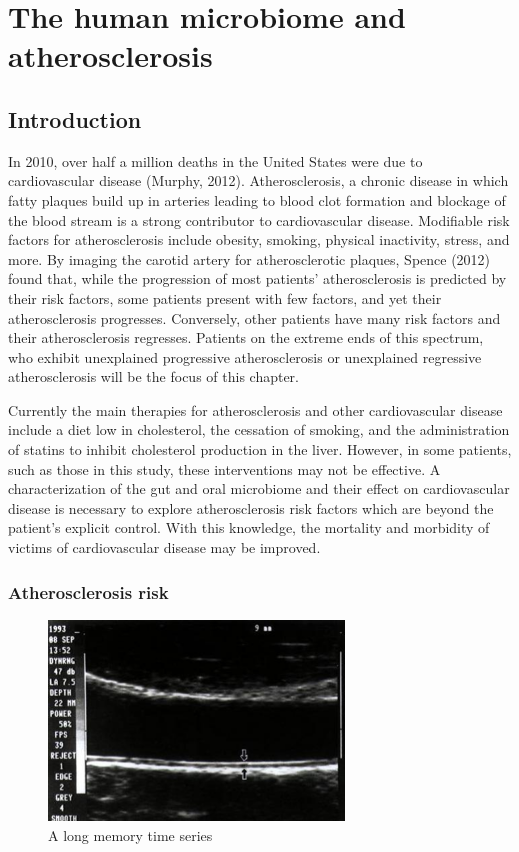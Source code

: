 \chapter{The human microbiome and atherosclerosis}
\section{Introduction}
In 2010, over half a million deaths in the United States were due to cardiovascular disease (Murphy, 2012). Atherosclerosis, a chronic disease in which fatty plaques build up in arteries leading to blood clot formation and blockage of the blood stream is a strong contributor to cardiovascular disease. Modifiable risk factors for atherosclerosis include obesity, smoking, physical inactivity, stress, and more. By imaging the carotid artery for atherosclerotic plaques, Spence (2012) found that, while the progression of most patients’ atherosclerosis is predicted by their risk factors, some patients present with few factors, and yet their atherosclerosis progresses. Conversely, other patients have many risk factors and their atherosclerosis regresses. Patients on the extreme ends of this spectrum, who exhibit unexplained progressive atherosclerosis or unexplained regressive atherosclerosis will be the focus of this chapter.

Currently the main therapies for atherosclerosis and other cardiovascular disease include a diet low in cholesterol, the cessation of smoking, and the administration of statins to inhibit cholesterol production in the liver. However, in some patients, such as those in this study, these interventions may not be effective. A characterization of the gut and oral microbiome and their effect on cardiovascular disease is necessary to explore atherosclerosis risk factors which are beyond the patient’s explicit control. With this knowledge, the mortality and morbidity of victims of cardiovascular disease may be improved.

\subsection{Atherosclerosis risk}

\begin{figure}[h]
\begin{center}
\includegraphics[width=0.7\textwidth]{intima_media_thickness.png}
\caption{A long memory time series\label{ts1}}
\end{center}
\end{figure}

